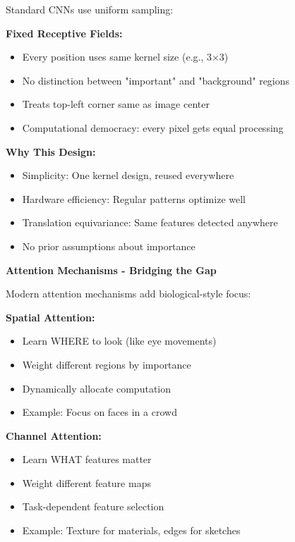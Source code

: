 \documentclass[12pt]{article}
\newcommand{\explanation}[1]{{\color{explanationcolor}#1}}
\begin{document}
\begin{enumerate}[(a)]
{    \explanation{
    Standard CNNs use uniform sampling:
    
    \textbf{Fixed Receptive Fields:}
    \begin{itemize}
        \item Every position uses same kernel size (e.g., 3×3)
        \item No distinction between "important" and "background" regions
        \item Treats top-left corner same as image center
        \item Computational democracy: every pixel gets equal processing
    \end{itemize}
    
    \textbf{Why This Design:}
    \begin{itemize}
        \item Simplicity: One kernel design, reused everywhere
        \item Hardware efficiency: Regular patterns optimize well
        \item Translation equivariance: Same features detected anywhere
        \item No prior assumptions about importance
    \end{itemize}
    }
    
    \textbf{Attention Mechanisms - Bridging the Gap}
    
    \explanation{
    Modern attention mechanisms add biological-style focus:
    
    \textbf{Spatial Attention:}
    \begin{itemize}
        \item Learn WHERE to look (like eye movements)
        \item Weight different regions by importance
        \item Dynamically allocate computation
        \item Example: Focus on faces in a crowd
    \end{itemize}
    
    \textbf{Channel Attention:}
    \begin{itemize}
        \item Learn WHAT features matter
        \item Weight different feature maps
        \item Task-dependent feature selection
        \item Example: Texture for materials, edges for sketches
    \end{itemize}
    
}}
\end{enumerate}
\end{document}
